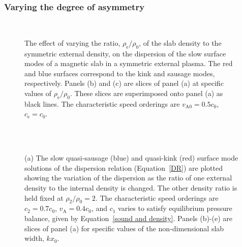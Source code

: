 \documentclass[12pt]{../style-files/ociamthesis}
\begin{document}
\subsubsection{Varying the degree of asymmetry}

\begin{figure}
	\centering
	 \\
	\caption{The effect of varying the ratio, $\rho_\textrm{e}/\rho_0$, of the slab density to the symmetric external density, on the dispersion of the slow surface modes of a magnetic slab in a symmetric external plasma. The red and blue surfaces correspond to the kink and sausage modes, respectively. Panels (b) and (c) are slices of panel (a) at specific values of $\rho_\textrm{e}/\rho_0$. These slices are superimposed onto panel (a) as black lines. The characteristic speed orderings are $v_\textrm{A0} = 0.5c_0$, $c_\textrm{e} = c_0$.}
\end{figure}


\begin{figure}
	\centering
	 \\
	 \\
	\caption{(a) The slow quasi-sausage (blue) and quasi-kink (red) surface mode solutions of the dispersion relation (Equation~\eqref{DR}) are plotted showing the variation of the dispersion as the ratio of one external density to the internal density is changed. The other density ratio is held fixed at $\rho_2/\rho_0=2$. The characteristic speed orderings are $c_2=0.7c_0$, $v_\textrm{A}=0.4c_0$, and $c_1$ varies to satisfy equilibrium pressure balance, given by Equation~\eqref{sound and density}. Panels (b)-(e) are slices of panel (a) for specific values of the non-dimensional slab width, $kx_0$.}
\end{figure}
\end{document}
